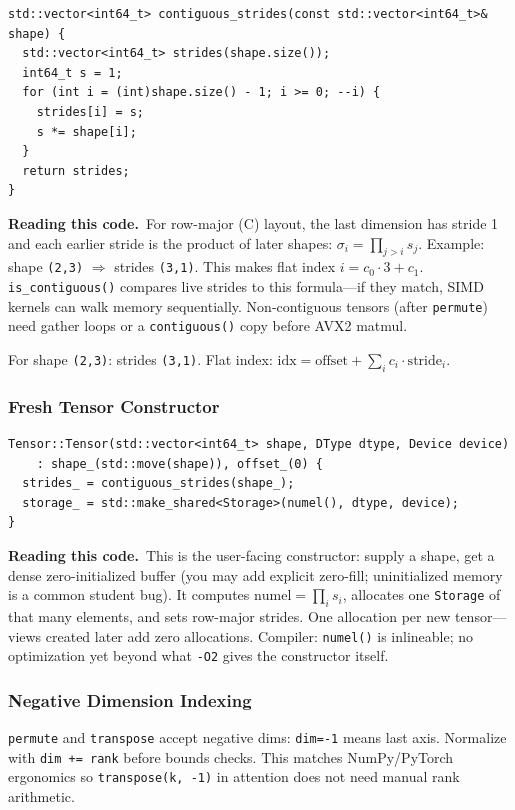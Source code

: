 \documentclass[11pt,a4paper]{article}
\newcommand{\explain}{\par\smallskip\noindent}
\newcommand{\exhead}{\textbf{Reading this code.}\ }
\begin{document}
\begin{lstlisting}[style=cpp]
std::vector<int64_t> contiguous_strides(const std::vector<int64_t>& shape) {
  std::vector<int64_t> strides(shape.size());
  int64_t s = 1;
  for (int i = (int)shape.size() - 1; i >= 0; --i) {
    strides[i] = s;
    s *= shape[i];
  }
  return strides;
}
\end{lstlisting}
\explain\exhead For row-major (C) layout, the last dimension has stride 1 and each earlier stride
is the product of later shapes: $\sigma_i = \prod_{j>i} s_j$. Example: shape \texttt{(2,3)}
$\Rightarrow$ strides \texttt{(3,1)}. This makes flat index $i = c_0 \cdot 3 + c_1$.
\texttt{is\_contiguous()} compares live strides to this formula---if they match, SIMD kernels
can walk memory sequentially. Non-contiguous tensors (after \texttt{permute}) need gather loops
or a \texttt{contiguous()} copy before AVX2 matmul.

For shape \texttt{(2,3)}: strides \texttt{(3,1)}. Flat index:
$\mathrm{idx} = \mathrm{offset} + \sum_i c_i \cdot \mathrm{stride}_i$.

\subsubsection{Fresh Tensor Constructor}

\begin{lstlisting}[style=cpp]
Tensor::Tensor(std::vector<int64_t> shape, DType dtype, Device device)
    : shape_(std::move(shape)), offset_(0) {
  strides_ = contiguous_strides(shape_);
  storage_ = std::make_shared<Storage>(numel(), dtype, device);
}
\end{lstlisting}
\explain\exhead This is the user-facing constructor: supply a shape, get a dense zero-initialized
buffer (you may add explicit zero-fill; uninitialized memory is a common student bug). It
computes $\text{numel} = \prod_i s_i$, allocates one \texttt{Storage} of that many elements,
and sets row-major strides. One allocation per new tensor---views created later add zero
allocations. Compiler: \texttt{numel()} is inlineable; no optimization yet beyond what
\texttt{-O2} gives the constructor itself.

\subsubsection{Negative Dimension Indexing}

\texttt{permute} and \texttt{transpose} accept negative dims: \texttt{dim=-1} means last
axis. Normalize with \texttt{dim += rank} before bounds checks. This matches NumPy/PyTorch
ergonomics so \texttt{transpose(k, -1)} in attention does not need manual rank arithmetic.
\end{document}
